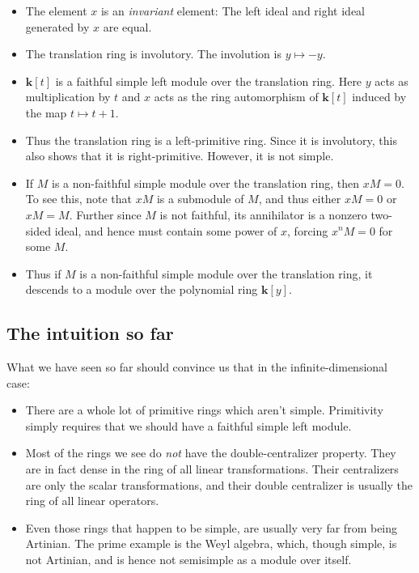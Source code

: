 \documentclass[a4paper]{amsart}
\newcommand{\field}{\mathbf{k}}
\begin{document}
\begin{itemize}

\item The element $x$ is an {\em invariant} element: The left ideal
  and right ideal generated by $x$ are equal. 

\item The translation ring is involutory. The involution is $y \mapsto
  -y$.

\item $\field[t]$ is a faithful simple left module over the translation
  ring.  Here $y$ acts as multiplication by $t$ and $x$ acts as the
  ring automorphism of $\field[t]$ induced by the map $t \mapsto t +
  1$.

\item Thus the translation ring is a left-primitive ring. Since it is
  involutory, this also shows that it is right-primitive. However, it
  is not simple.
\item If $M$ is a non-faithful simple module over the translation
  ring, then $xM = 0$. To see this, note that $xM$ is a submodule of
  $M$, and thus either $xM = 0$ or $xM = M$. Further since $M$ is not
  faithful, its annihilator is a nonzero two-sided ideal, and hence
  must contain some power of $x$, forcing $x^nM = 0$ for some $M$.

\item Thus if $M$ is a non-faithful simple module over the translation
  ring, it descends to a module over the polynomial ring $\field[y]$.
\end{itemize}

\subsection{The intuition so far}

What we have seen so far should convince us that in the
infinite-dimensional case:

\begin{itemize}

\item There are a whole lot of primitive rings which aren't
  simple. Primitivity simply requires that we should have a faithful
  simple left module.

\item Most of the rings we see do {\em not} have the
  double-centralizer property. They are in fact dense in the ring of
  all linear transformations. Their centralizers are only the scalar
  transformations, and their double centralizer is usually the ring of
  all linear operators.

\item Even those rings that happen to be simple, are usually very far
  from being Artinian. The prime example is the Weyl algebra, which,
  though simple, is not Artinian, and is hence not semisimple as a
  module over itself.

\end{itemize}
\end{document}
